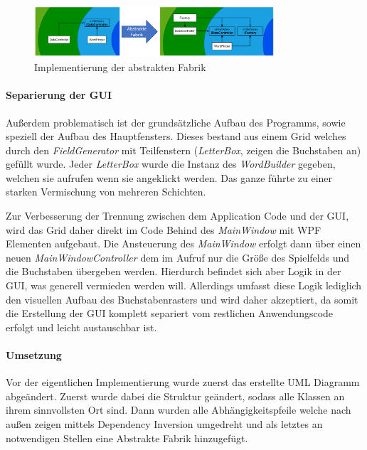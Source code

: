 \begin{figure}[!ht]
  \centering
  \includegraphics[width=0.8\textwidth]{Bilder/AbstrakteFabrik.PNG}
  \caption{Implementierung der abstrakten Fabrik}
  \label{Abb:AbstrakteFabrik}
\end{figure}

\paragraph{Separierung der GUI}
Außerdem problematisch ist der grundsätzliche Aufbau des Programms, sowie speziell der Aufbau des Hauptfensters. Dieses bestand aus einem Grid welches durch den \textit{FieldGenerator} mit Teilfenstern (\textit{LetterBox}, zeigen die Buchstaben an) gefüllt wurde. Jeder \textit{LetterBox} wurde die Instanz des \textit{WordBuilder} gegeben, welchen sie aufrufen wenn sie angeklickt werden. Das ganze führte zu einer starken Vermischung von mehreren Schichten.


Zur Verbesserung der Trennung zwischen dem Application Code und der GUI, wird das Grid daher direkt im Code Behind des \textit{MainWindow} mit WPF  Elementen aufgebaut. Die Ansteuerung des \textit{MainWindow} erfolgt dann über einen neuen \textit{MainWindowController} dem im Aufruf nur die Größe des Spielfelds und die Buchstaben übergeben werden. Hierdurch befindet sich aber Logik in der GUI, was generell vermieden werden will. Allerdings umfasst diese Logik lediglich den visuellen Aufbau des Buchstabenrasters und wird daher akzeptiert, da somit die Erstellung der GUI komplett separiert vom restlichen Anwendungscode erfolgt und leicht austauschbar ist.

\paragraph{Umsetzung}
Vor der eigentlichen Implementierung wurde zuerst das erstellte UML Diagramm abgeändert. Zuerst wurde dabei die Struktur geändert, sodass alle Klassen an ihrem sinnvollsten Ort sind. Dann wurden alle Abhängigkeitspfeile welche nach außen zeigen mittels Dependency Inversion umgedreht und als letztes an notwendigen Stellen eine Abstrakte Fabrik hinzugefügt. 

